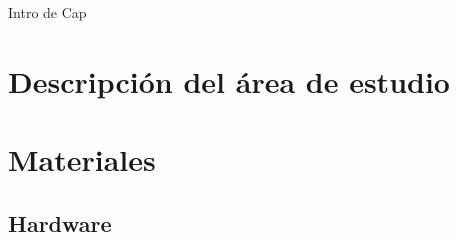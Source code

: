 \documentclass[12pt,twoside]{reedthesis}
\theoremstyle{definition}
\theoremstyle{definition}
\theoremstyle{definition}
\theoremstyle{remark}
\begin{document}
Intro de Cap

\hypertarget{descripcion-del-area-de-estudio}{%
\section{Descripción del área de
estudio}\label{descripcion-del-area-de-estudio}}

\hypertarget{materiales}{%
\section{Materiales}\label{materiales}}

\hypertarget{hardware}{%
\subsection{Hardware}\label{hardware}}
\end{document}
